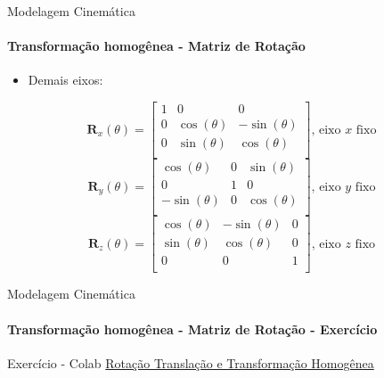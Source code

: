 \documentclass[aspectratio=169]{beamer}
\begin{document}
\begin{frame}{Modelagem Cinemática}
    \framesubtitle{Transformação homogênea - Matriz de Rotação}
    \begin{itemize}
        \item Demais eixos:
    \end{itemize}
    \begin{block}{}
        \begin{equation*}
            \mathbf{R}_x(\theta) =
            \begin{bmatrix}
                1 & 0            & 0             \\
                0 & \cos(\theta) & -\sin(\theta) \\
                0 & \sin(\theta) & \cos(\theta)  \\
            \end{bmatrix} \text{, eixo $x$ fixo}
        \end{equation*}
        \begin{equation*}
            \mathbf{R}_y(\theta) =
            \begin{bmatrix}
                \cos(\theta)  & 0 & \sin(\theta) \\
                0             & 1 & 0            \\
                -\sin(\theta) & 0 & \cos(\theta) \\
            \end{bmatrix} \text{, eixo $y$ fixo}
        \end{equation*}
        \begin{equation*}
            \mathbf{R}_z(\theta) =
            \begin{bmatrix}
                \cos(\theta) & -\sin(\theta) & 0 \\
                \sin(\theta) & \cos(\theta) & 0 \\
                0            & 0            & 1 \\
            \end{bmatrix} \text{, eixo $z$ fixo}
        \end{equation*}
    \end{block}
\end{frame}

\begin{frame}{Modelagem Cinemática}
    \framesubtitle{Transformação homogênea - Matriz de Rotação - Exercício}
    \begin{block}{Exercício - Colab}
        \href{https://cursoseaulas.gitlab.io/robotica-movel/exercicio01.ipynb}{Rotação Translação e Transformação Homogênea}
    \end{block}
\end{frame}
\end{document}
